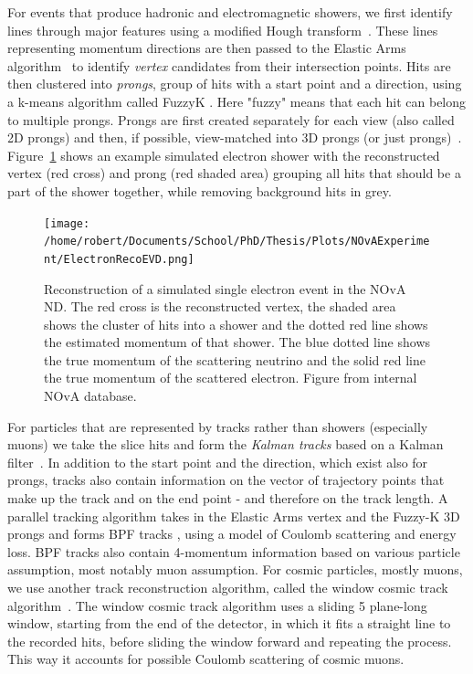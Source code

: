 For events that produce hadronic and electromagnetic showers, we first identify lines through major features using a modified Hough transform~\cite{HoughTransform.pdf}. These lines representing momentum directions are then passed to the Elastic Arms algorithm~\cite{ElasticArms.pdf} to identify \textit{vertex} candidates from their intersection points. Hits are then clustered into \textit{prongs}, group of hits with a start point and a direction, using a k-means algorithm called FuzzyK \cite{FuzzyKClustering.pdf,FuzzyKFuzzyness.pdf}. Here "fuzzy" means that each hit can belong to multiple prongs. Prongs are first created separately for each view (also called 2D prongs) and then, if possible, view-matched into 3D prongs (or just prongs)~\cite{NOvAReco.pdf}. Figure~\ref{fig:NOvARecoEVD} shows an example simulated electron shower with the reconstructed vertex (red cross) and prong (red shaded area) grouping all hits that should be a part of the shower together, while removing background hits in grey.

\begin{figure}[ht]
\centering
\texttt{[image: /home/robert/Documents/School/PhD/Thesis/Plots/NOvAExperiment/ElectronRecoEVD.png]}
\caption[NOvA reconstruction of a single electron]{Reconstruction of a simulated single electron event in the \acrshort{NOvA} \acrshort{ND}. The red cross is the reconstructed vertex, the shaded area shows the cluster of hits into a shower and the dotted red line shows the estimated momentum of that shower. The blue dotted line shows the true momentum of the scattering neutrino and the solid red line the true momentum of the scattered electron. Figure from internal \acrshort{NOvA} database.}
\label{fig:NOvARecoEVD}
\end{figure}

For particles that are represented by tracks rather than showers (especially muons) we take the slice hits and form the \textit{Kalman tracks} based on a Kalman filter~\cite{RaddatzNOvAThesis_KalmanTracks.pdf}. In addition to the start point and the direction, which exist also for prongs, tracks also contain information on the vector of trajectory points that make up the track and on the end point - and therefore on the track length. A parallel tracking algorithm takes in the Elastic Arms vertex and the Fuzzy-K 3D prongs and forms \gls{BPF} tracks \cite{BairdNOvAThesis_BPFTracks.pdf,BreakPointFitterBasics.pdf}, using a model of Coulomb scattering and energy loss. \gls{BPF} tracks also contain 4-momentum information based on various particle assumption, most notably muon assumption. For cosmic particles, mostly muons, we use another track reconstruction algorithm, called the window cosmic track algorithm~\cite{NOvA-doc-15977}. The window cosmic track algorithm uses a sliding 5 plane-long window, starting from the end of the detector, in which it fits a straight line to the recorded hits, before sliding the window forward and repeating the process. This way it accounts for possible Coulomb scattering of cosmic muons.

